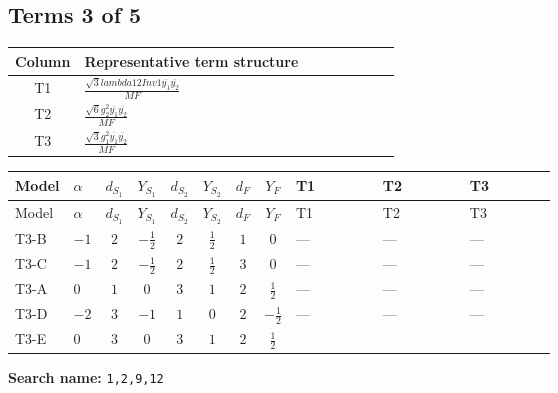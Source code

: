 \documentclass[8pt]{article}
\begin{document}
\begin{landscape}
\subsection*{Terms 3 of 5}
\begin{center}
\begin{tabular}{@{}c >{\raggedright\arraybackslash}p{0.82\linewidth}@{}}
\toprule
Column & Representative term structure \\
\midrule
T1 & \(\displaystyle \frac{\sqrt{3} lambda12Inv1 \overline{y_{1}} \overline{y_{2}}}{MF}\) \\
\midrule
T2 & \(\displaystyle \frac{\sqrt{6} g_{2}^{2} \overline{y_{1}} \overline{y_{2}}}{MF}\) \\
\midrule
T3 & \(\displaystyle \frac{\sqrt{3} g_{1}^{2} \overline{y_{1}} \overline{y_{2}}}{MF}\) \\
\midrule
\bottomrule
\end{tabular}
\end{center}
\smallskip
\tiny
\begin{longtable}{@{}llcccccc >{\raggedright\arraybackslash}p{0.21\linewidth} >{\raggedright\arraybackslash}p{0.21\linewidth} >{\raggedright\arraybackslash}p{0.21\linewidth}@{}}
\toprule
Model & $\alpha$ & $d_{S_1}$ & $Y_{S_1}$ & $d_{S_2}$ & $Y_{S_2}$ & $d_F$ & $Y_F$ & T1 & T2 & T3 \\
\midrule
\endfirsthead
\toprule
Model & $\alpha$ & $d_{S_1}$ & $Y_{S_1}$ & $d_{S_2}$ & $Y_{S_2}$ & $d_F$ & $Y_F$ & T1 & T2 & T3 \\
\midrule
\endhead
T3-B & $-1$ & $2$ & $-\frac{1}{2}$ & $2$ & $\frac{1}{2}$ & $1$ & $0$ & --- & --- & --- \\
\midrule
T3-C & $-1$ & $2$ & $-\frac{1}{2}$ & $2$ & $\frac{1}{2}$ & $3$ & $0$ & --- & --- & --- \\
\midrule
T3-A & $0$ & $1$ & $0$ & $3$ & $1$ & $2$ & $\frac{1}{2}$ & --- & --- & --- \\
\midrule
T3-D & $-2$ & $3$ & $-1$ & $1$ & $0$ & $2$ & $-\frac{1}{2}$ & --- & --- & --- \\
\midrule
T3-E & $0$ & $3$ & $0$ & $3$ & $1$ & $2$ & $\frac{1}{2}$ & \scriptsize\adjustbox{max width=\linewidth}{$\begin{gathered} - \frac{\sqrt{3} lambda12Inv1 \overline{y_{1}} \overline{y_{2}}}{6 MF}\end{gathered}$} & \scriptsize\adjustbox{max width=\linewidth}{$\begin{gathered} \frac{\sqrt{6} g_{2}^{2} \overline{y_{1}} \overline{y_{2}}}{6 MF}\end{gathered}$} & \scriptsize\adjustbox{max width=\linewidth}{$\begin{gathered} \frac{\sqrt{3} g_{1}^{2} \overline{y_{1}} \overline{y_{2}}}{8 MF}\end{gathered}$} \\
\midrule
\bottomrule
\end{longtable}
\clearpage
\noindent\textbf{Search name: }\texttt{1,2,9,12}\par\smallskip

\end{landscape}
\end{document}
